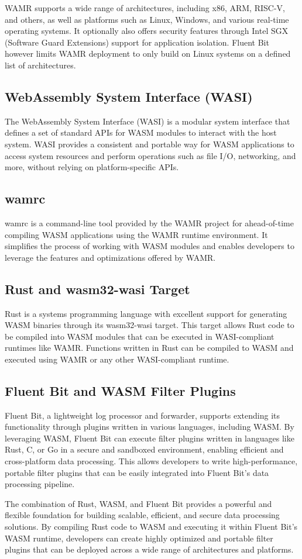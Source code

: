 WAMR supports a wide range of architectures, including x86, ARM, RISC-V, and others, as well as platforms such as Linux, Windows, and various real-time operating systems. It optionally also offers security features through Intel SGX (Software Guard Extensions) support for application isolation. Fluent Bit however limits WAMR deployment to only build on Linux systems on a defined list of architectures. 

\subsection{WebAssembly System Interface (WASI)}
The WebAssembly System Interface (WASI) is a modular system interface that defines a set of standard APIs for WASM modules to interact with the host system. WASI provides a consistent and portable way for WASM applications to access system resources and perform operations such as file I/O, networking, and more, without relying on platform-specific APIs.

\subsection{wamrc}
wamrc is a command-line tool provided by the WAMR project for ahead-of-time compiling WASM applications using the WAMR runtime environment. It simplifies the process of working with WASM modules and enables developers to leverage the features and optimizations offered by WAMR.

\subsection{Rust and wasm32-wasi Target}
Rust is a systems programming language with excellent support for generating WASM binaries through its wasm32-wasi target. This target allows Rust code to be compiled into WASM modules that can be executed in WASI-compliant runtimes like WAMR. Functions written in Rust can be compiled to WASM and executed using WAMR or any other WASI-compliant runtime.

\subsection{Fluent Bit and WASM Filter Plugins}
Fluent Bit, a lightweight log processor and forwarder, supports extending its functionality through plugins written in various languages, including WASM. By leveraging WASM, Fluent Bit can execute filter plugins written in languages like Rust, C, or Go in a secure and sandboxed environment, enabling efficient and cross-platform data processing. This allows developers to write high-performance, portable filter plugins that can be easily integrated into Fluent Bit's data processing pipeline.

The combination of Rust, WASM, and Fluent Bit provides a powerful and flexible foundation for building scalable, efficient, and secure data processing solutions. By compiling Rust code to WASM and executing it within Fluent Bit's WASM runtime, developers can create highly optimized and portable filter plugins that can be deployed across a wide range of architectures and platforms.